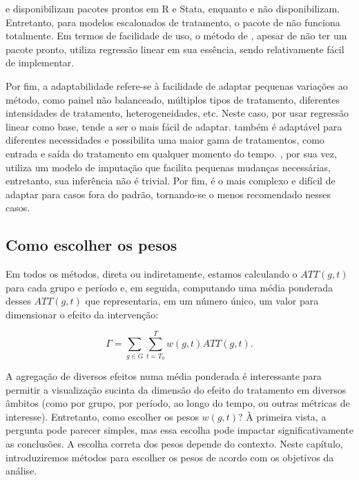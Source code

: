 \documentclass[portugues]{article}
\begin{document}
\cite{callaway2021difference} e \cite{borusyak2024revisiting} disponibilizam pacotes prontos em R e Stata, enquanto \cite{de2020two} e \cite{sun2021estimating} não disponibilizam. Entretanto, para modelos escalonados de tratamento, o pacote de \cite{borusyak2024revisiting} não funciona totalmente. Em termos de facilidade de uso, o método de \cite{sun2021estimating}, apesar de não ter um pacote pronto, utiliza regressão linear em sua essência, sendo relativamente fácil de implementar.

Por fim, a adaptabilidade refere-se à facilidade de adaptar pequenas variações ao método, como painel não balanceado, múltiplos tipos de tratamento, diferentes intensidades de tratamento, heterogeneidades, etc. Neste caso, por usar regressão linear como base, \cite{sun2021estimating} tende a ser o mais fácil de adaptar. \cite{de2020two} também é adaptável para diferentes necessidades e possibilita uma maior gama de tratamentos, como entrada e saída do tratamento em qualquer momento do tempo. \cite{borusyak2024revisiting}, por sua vez, utiliza um modelo de imputação que facilita pequenas mudanças necessárias, entretanto, sua inferência não é trivial. Por fim, \cite{callaway2021difference} é o mais complexo e difícil de adaptar para casos fora do padrão, tornando-se o menos recomendado nesses casos.

\subsection{Como escolher os pesos}

Em todos os métodos, direta ou indiretamente, estamos calculando o $ATT(g,t)$ para cada grupo e período e, em seguida, computando uma média ponderada desses $ATT(g,t)$ que representaria, em um número único, um valor para dimensionar o efeito da intervenção:

$$ \Gamma = \sum_{g \in G} \sum_{t=T_0}^{T} w(g,t) ATT(g,t). $$

\noindent A agregação de diversos efeitos numa média ponderada é interessante para permitir a visualização sucinta da dimensão do efeito do tratamento em diversos âmbitos (como por grupo, por período, ao longo do tempo, ou outras métricas de interesse). Entretanto, como escolher os pesos $w(g,t)$? À primeira vista, a pergunta pode parecer simples, mas essa escolha pode impactar significativamente as conclusões. A escolha correta dos pesos depende do contexto. Neste capítulo, introduziremos métodos para escolher os pesos de acordo com os objetivos da análise.
\end{document}
